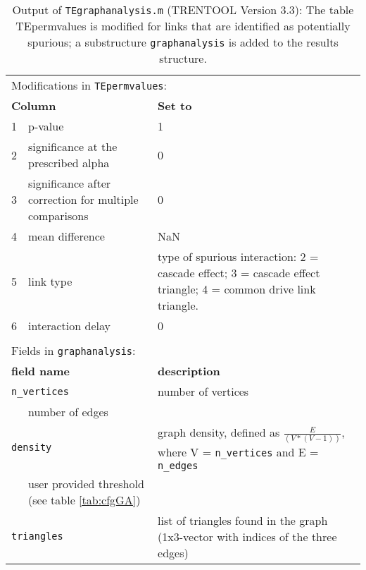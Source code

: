 \begin{table}[H]
\centering
\caption[Results \texttt{TEgraphanalysis.m}]{Output of \texttt{TEgraphanalysis.m} (TRENTOOL Version 3.3): The table TEpermvalues is modified for links that are identified as potentially spurious; a substructure \texttt{graphanalysis} is added to the results structure.} 
\begin{tabularx}{\textwidth}{p{1cm}p{6cm}X} \toprule
\multicolumn{3}{l}{Modifications in \texttt{TEpermvalues}:} \\
\multicolumn{2}{l}{\textbf{Column}} & \textbf{Set to} \\ \midrule
1 & p-value 	& 1 \\
\rowcolor{Gray}
2 & significance at the prescribed alpha & 0 \\
3 & significance after correction for multiple comparisons & 0 \\
\rowcolor{Gray}
4 & mean difference & NaN \\
5 & link type & type of spurious interaction: 2 = cascade effect; 3 = cascade effect triangle; 4 = common drive link triangle. \\
\rowcolor{Gray}
6 & interaction delay & 0 \\ \hline
\multicolumn{3}{l}{} \\
\multicolumn{3}{l}{Fields in \texttt{graphanalysis}:} \\
\multicolumn{2}{l}{\textbf{field name}} & \textbf{description} \\ \hline
\multicolumn{2}{l}{\texttt{n\_vertices}}  & number of vertices \\ 
\rowcolor{Gray}
\multicolumn{2}{>{\columncolor{Gray}}l}{\texttt{n\_edges}}    & number of edges \\ 
\multicolumn{2}{l}{\texttt{density}}      & graph density, defined as $\frac{E}{(V*(V-1))}$, where V = \verb+n_vertices+ and E = \verb+n_edges+\\ 
\rowcolor{Gray}
\multicolumn{2}{>{\columncolor{Gray}}l}{\texttt{threshold}}   & user provided threshold (see table \ref{tab:cfgGA})\\ 
\multicolumn{2}{l}{\texttt{triangles}} & list of triangles found in the graph (1x3-vector with indices of the three edges)\\ \bottomrule
\end{tabularx} \label{tab:graphanalysis_results}
\end{table}